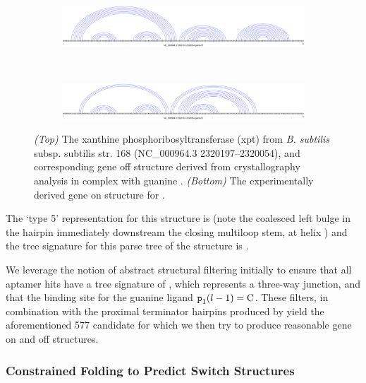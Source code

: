 \begin{figure}[!ht]
\centering
\begin{subfigure}[h]{\textwidth}
\centering
\includegraphics[width=.9\textwidth]{Figures/Ribofinder/NC_000964_3_2320197_2320054_OFF.pdf}
\end{subfigure} \\
\medskip
\begin{subfigure}[h]{\textwidth}
\centering
\includegraphics[width=.9\textwidth]{Figures/Ribofinder/NC_000964_3_2320197_2320054_ON.pdf}
\end{subfigure}
\caption{{\em (Top)} The xanthine phosphoribosyltransferase (xpt) \grb from
{\em B. subtilis} subsp. subtilis str. 168 (NC\_000964.3 2320197--2320054),
and corresponding gene off structure derived from crystallography analysis in
complex with guanine \citep{breaker:riboswitch2}. {\em (Bottom)} The experimentally
derived gene on structure for \Bsxpt.}
\label{fig:rfinder:xptOff}
\end{figure}

The \rshapes \citep{janssen:2015cq} `type 5' representation for this structure is
\ms{[[][]][][]} (note the coalesced left bulge in the hairpin immediately
downstream the closing multiloop stem, at helix ) and the tree
signature for this parse tree of the structure is \ms{[0,1,2,2,1,1]}.

We leverage the notion of abstract structural filtering initially to ensure that
all \infernal aptamer hits have a tree signature of \ms{[0,1,2,2]}, which
represents a three-way junction, and that the binding site for the guanine ligand
${\text{\mbox{\tt p}}}_{\text{1}}(l - 1) = \text{C}$. These filters, in combination with the
proximal terminator hairpins produced by \tthp yield the aforementioned 577
candidate \grbs for which we then try to produce reasonable gene on and off
structures.

\subsubsection{Constrained Folding to Predict Switch Structures}
\label{subsubsec:rfinder:consfold}

